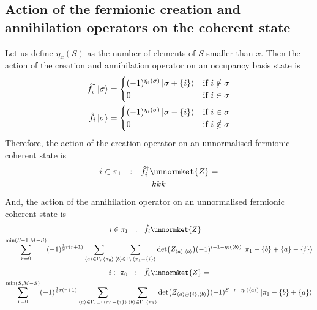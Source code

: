 \documentclass[12pt]{article}
\newcommand{\seq}[1]{\langle #1\rangle}
\newcommand{\hc}{^\dagger}
\begin{document}
	\subsection{Action of the fermionic creation and annihilation operators on the coherent state}
	Let us define $\eta_x(S)$ as the number of elements of $S$ smaller than $x$. Then the action of the creation and annihilation operator on an occupancy basis state is
	\begin{eqnarray}
	\hat{f}\hc_i\ket{\sigma}=\begin{cases}
		(-1)^{\eta_i(\sigma)}\ket{\sigma + \{i\}} & \text{if }i\notin\sigma\\
		0 & \text{if }i\in\sigma
	\end{cases}\\
	\hat{f}_i\ket{\sigma}=\begin{cases}
		(-1)^{\eta_i(\sigma)}\ket{\sigma - \{i\}} & \text{if }i\in\sigma\\
		0 & \text{if }i\notin\sigma
	\end{cases}
	\end{eqnarray}
	Therefore, the action of the creation operator on an unnormalised fermionic coherent state is
	\begin{multline}
	i\in\pi_1\qq{:}\hat{f}\hc_{i}\unnormket{Z}=\\
	kkk
	\end{multline}
	And, the action of the annihilation operator on an unnormalised fermionic coherent state is
	\begin{multline}
	i\in\pi_1\qq{:}\hat{f}_{i}\unnormket{Z}=\\
	\sum_{r=0}^{\min(S-1,M-S)}(-1)^{\frac{1}{2}r(r+1)}\sum_{\seq{a}\in\Gamma_r\seq{\pi_0}}\sum_{\seq{b}\in\Gamma_r\seq{\pi_1-\{i\}}}\det(Z_{\seq{a},\seq{b}})(-1)^{i-1-\eta_i(\seq{b})}\ket{\pi_1-\{b\}+\{a\}-\{i\}}
	\end{multline}
	\begin{multline}
	i\in\pi_0\qq{:}\hat{f}_{i}\unnormket{Z}=\\
	\sum_{r=0}^{\min(S,M-S)}(-1)^{\frac{1}{2}r(r+1)}\sum_{\seq{a}\in\Gamma_{r-1}\seq{\pi_0-\{i\}}}\sum_{\seq{b}\in\Gamma_r\seq{\pi_1}}\det(Z_{\seq{a}\oplus\{i\},\seq{b}})(-1)^{S-r-\eta_i(\seq{a})}\ket{\pi_1-\{b\}+\{a\}}
	\end{multline}
\end{document}
